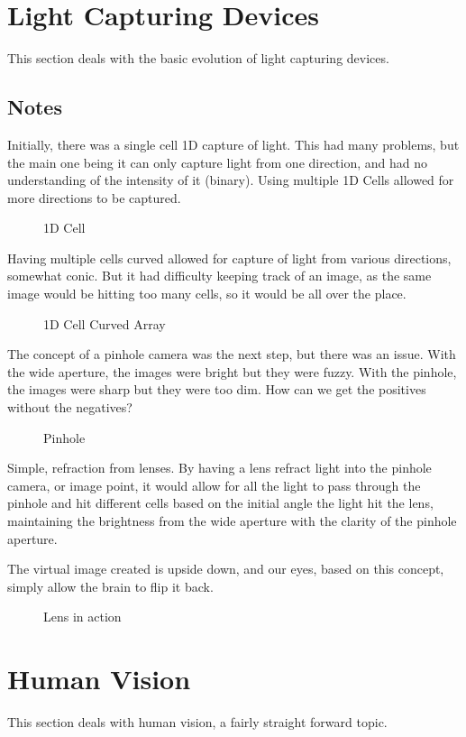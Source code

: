 \section{Light Capturing Devices}
This section deals with the basic evolution of light capturing devices.
\subsection{Notes}
Initially, there was a single cell 1D capture of light. This had many problems, but the main one being it can only capture light from one direction, and had no understanding of the intensity of it (binary). Using multiple 1D Cells allowed for more directions to be captured.
\begin{figure}[!htb]
	\caption{\label{fig:1dcell} 1D Cell}
\end{figure}
Having multiple cells curved allowed for capture of light from various directions, somewhat conic. But it had difficulty keeping track of an image, as the same image would be hitting too many cells, so it would be all over the place.
\begin{figure}[!htb]
	\caption{\label{fig:1dlinearcell} 1D Cell Curved Array}
\end{figure}
The concept of a pinhole camera was the next step, but there was an issue. With the wide aperture, the images were bright but they were fuzzy. With the pinhole, the images were sharp but they were too dim. How can we get the positives without the negatives?
\begin{figure}[!htb]
	\caption{\label{fig:pinholeaperture} Pinhole}
\end{figure}
Simple, refraction from lenses. By having a lens refract light into the pinhole camera, or image point, it would allow for all the light to pass through the pinhole and hit different cells based on the initial angle the light hit the lens, maintaining the brightness from the wide aperture with the clarity of the pinhole aperture.

The virtual image created is upside down, and our eyes, based on this concept, simply allow the brain to flip it back.
\begin{figure}[!htb]
	\caption{\label{fig:lens} Lens in action}
\end{figure}
\section{Human Vision}
This section deals with human vision, a fairly straight forward topic.
